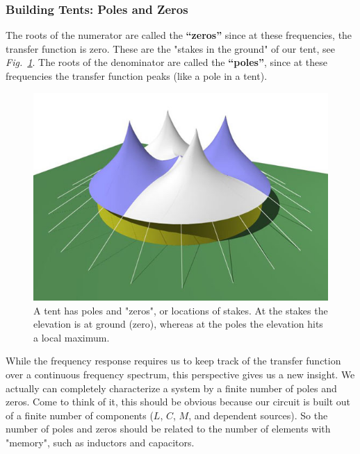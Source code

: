 \subsubsection{Building Tents: Poles and Zeros}
The roots of the numerator are called the \textbf{“zeros”} since at these frequencies, the transfer function is zero.  These are the "stakes in the ground" of our tent, see \emph{Fig.~\ref{fig:tent}}.  The roots of the denominator are called the \textbf{“poles”}, since at these frequencies the transfer function peaks (like a pole in a tent).
\begin{figure}[tb]
\centering
\includegraphics[angle=-0.0,width=.8\columnwidth]{image_11.jpg}
\caption{A tent has poles and "zeros", or locations of stakes.  At the stakes the elevation is at ground (zero), whereas at the poles the elevation hits a local maximum.}
\label{fig:tent}
\end{figure}
While the frequency response requires us to keep track of the transfer function over a continuous frequency spectrum, this perspective gives us a new insight.  We actually can completely characterize a system by a finite number of poles and zeros.  Come to think of it, this should be obvious because our circuit is built out of a finite number of components ($L$, $C$, $M$, and dependent sources).  So the number of poles and zeros should be related to the number of elements with "memory", such as inductors and capacitors.  
